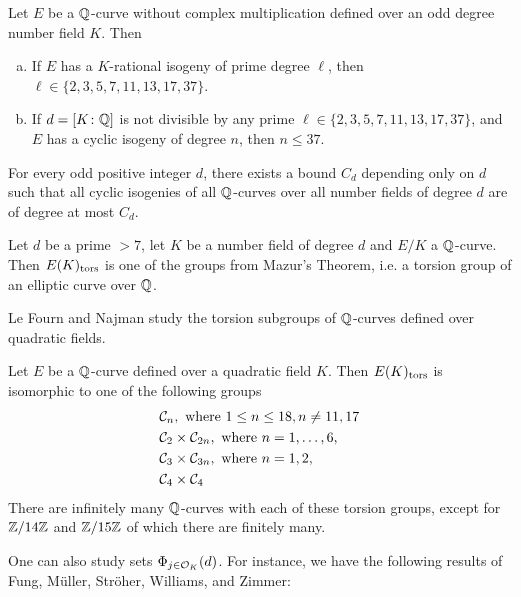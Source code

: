 \begin{thm}
Let $E$ be a $\mathbb{Q}$-curve without complex multiplication defined over an odd degree number field $K$. Then
	\begin{enumerate}[(a)]
	\item If $E$ has a $K$-rational isogeny of prime degree $\ell$, then $\ell \in \{2,3,5,7,11,13,17,37 \}$.
	\item If $d= [K \colon \mathbb{Q}]$ is not divisible by any prime $\ell \in \{ 2,3,5,7,11,13,17,37 \}$, and $E$ has a cyclic isogeny of degree $n$, then $n \leq 37$. 
	\end{enumerate}
\end{thm}


\begin{thm}
For every odd positive integer $d$, there exists a bound $C_d$ depending only on $d$ such that all cyclic isogenies of all $\mathbb{Q}$-curves over all number fields of degree $d$ are of degree at most $C_d$.
\end{thm}


\begin{thm}
Let $d$ be a prime $>7$, let $K$ be a number field of degree $d$ and $E/K$ a $\mathbb{Q}$-curve. Then $E(K)_{\text{tors}}$ is one of the groups from Mazur's Theorem, i.e. a torsion group of an elliptic curve over $\mathbb{Q}$. 
\end{thm}


Le Fourn and Najman study the torsion subgroups of $\mathbb{Q}$-curves defined over quadratic fields. 


\begin{thm}
Let $E$ be a $\mathbb{Q}$-curve defined over a quadratic field $K$. Then $E(K)_{\text{tors}}$ is isomorphic to one of the following groups
	\[
	\begin{aligned}
	&\mathcal{C}_n, \text{ where } 1 \leq n \leq 18, n \neq 11, 17 \\
	&\mathcal{C}_2 \times \mathcal{C}_{2n}, \text{ where } n= 1,\ldots,6, \\
	&\mathcal{C}_3 \times \mathcal{C}_{3n}, \text{ where } n=1,2, \\
	&\mathcal{C}_4 \times \mathcal{C}_4
	\end{aligned}
	\]
There are infinitely many $\mathbb{Q}$-curves with each of these torsion groups, except for $\mathbb{Z}/14\mathbb{Z}$ and $\mathbb{Z}/15\mathbb{Z}$ of which there are finitely many. 
\end{thm}


One can also study sets $\Phi_{j \in \mathcal{O}_K}(d)$. For instance, we have the following results of Fung, M{\"u}ller, Str{\"o}her, Williams, and Zimmer:


